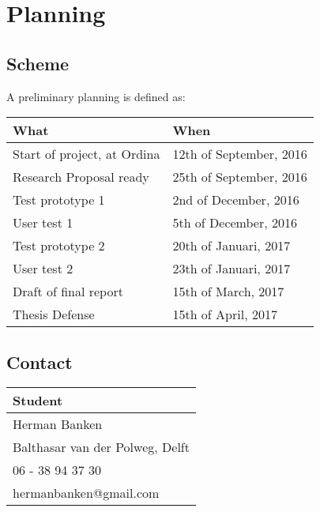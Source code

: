 \section{Planning}

\subsection{Scheme} A preliminary planning is defined as:
\begin{table}[h]
    \centering
    \begin{tabular}{@{}ll@{}}
        \textbf{What}               & \textbf{When}           \\ 
        \hline
        Start of project, at Ordina & 12th of September, 2016 \\ 
        Research Proposal ready     & 25th of September, 2016 \\ 
        \hline
        Test prototype 1            & 2nd of December, 2016   \\ 
        User test 1                 & 5th of December, 2016   \\ 
        \hline
        Test prototype 2            & 20th of Januari, 2017   \\ 
        User test 2                 & 23th of Januari, 2017   \\ 
        \hline
        Draft of final report       & 15th of March, 2017     \\ 
        \hline
        Thesis Defense              & 15th of April, 2017     \\ 
    \end{tabular}
\end{table}

\subsection{Contact}

\begin{table}[h]
    \centering
    \begin{tabular}{@{}l@{}}
        \textbf{Student}                \\ 
        \hline
        Herman Banken                   \\ 
        Balthasar van der Polweg, Delft \\ 
        06 - 38 94 37 30                \\ 
        hermanbanken@gmail.com          \\ 
    \end{tabular}
\end{table}

